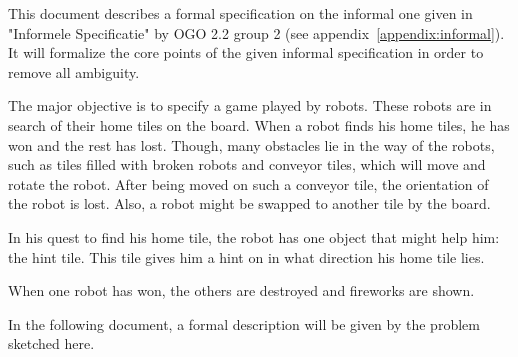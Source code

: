 This document describes a formal specification on the informal one given in "Informele Specificatie" by OGO 2.2 group 2 (see appendix~\ref{appendix:informal}).
It will formalize the core points of the given informal specification in order to remove all ambiguity.

The major objective is to specify a game played by robots. These robots are in search of their home tiles on the board. When a robot finds his home tiles, he has won and the rest has lost. Though, many obstacles lie in the way of the robots, such as tiles filled with broken robots and conveyor tiles, which will move and rotate the robot. After being moved on such a conveyor tile, the orientation of the robot is lost. Also, a robot might be swapped to another tile by the board. 

In his quest to find his home tile, the robot has one object that might help him: the hint tile. This tile gives him a hint on in what direction his home tile lies. 

When one robot has won, the others are destroyed and fireworks are shown.

In the following document, a formal description will be given by the problem sketched here.
